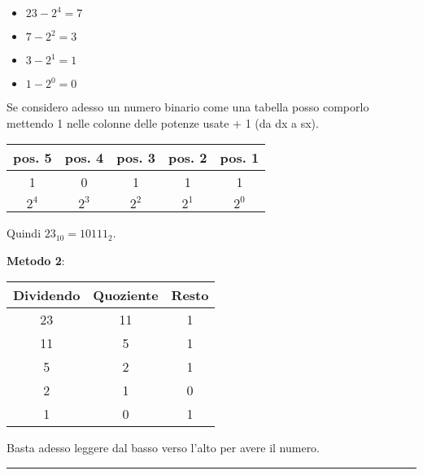 \documentclass{article}
\begin{document}
    \vspace{2pt}

    \begin{itemize}
    \item$23 - 2^4 = 7$
    \item$7 - 2^2 = 3$
    \item$3 - 2^1 = 1$
    \item$1 - 2^0 = 0$
    \end{itemize}

    \vspace{1pt}

    \noindent Se considero adesso un numero binario come una tabella posso comporlo mettendo 1 nelle colonne delle potenze usate + 1 (da dx a sx).
    
    \begin{table}[ht]
        \centering
        \begin{tabular}{c|c|c|c|c}
            pos. 5 & pos. 4 & pos. 3 & pos. 2 & pos. 1\\
            \hline
            \rule{0pt}{3ex}1 & 0 & 1 & 1 & 1\\
            \hline
            \rule{0pt}{3ex}$2^4$ & $2^3$ &$ 2^2$ & $2^1$ & $2^0$
        \end{tabular}
    \end{table}

    \vspace{1pt}

    \noindent Quindi $23_{10} = 10111_2$.

    \newpage

    \textbf{Metodo 2}:
    
    \begin{table}[ht]
        \centering
        \begin{tabular}{c|c|c}
            Dividendo & Quoziente & Resto\\
            \hline
            \rule{0pt}{3ex}23 & 11 & 1\\
            11 & 5 & 1\\
            5 & 2 & 1\\
            2 & 1 & 0\\
            1 & 0 & 1
        \end{tabular}
    \end{table}

Basta adesso leggere dal basso verso l'alto per avere il numero.

\noindent\rule{\textwidth}{0.5pt}

\vspace{4pt}
\end{document}
